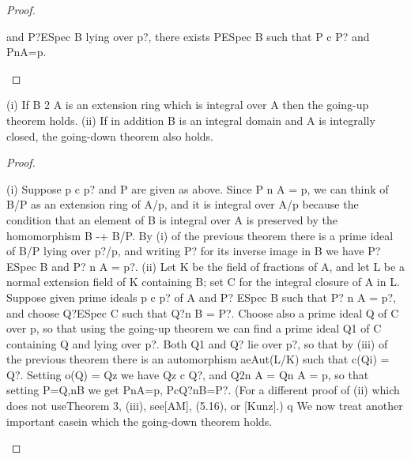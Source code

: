 \begin{proof}
\begin{mathematicalrecord}
and P?ESpec B lying over p?, there exists PESpec B such that P c P? and
PnA=p.
\end{mathematicalrecord}
\end{proof}


\begin{theorem}[Theorem 9.4]\label{mcrt-auto-theorem-9-4}\uses{}
\begin{mathematicalrecord}
(i) If B 2 A is an extension ring which is integral over A then
the going-up theorem holds.
   (ii) If in addition B is an integral domain and A is integrally closed, the
going-down      theorem also holds.
\end{mathematicalrecord}
\end{theorem}
\begin{proof}
\begin{mathematicalrecord}
(i) Suppose p c p? and P are given as above. Since P n A = p, we can
think of B/P as an extension ring of A/p, and it is integral over A/p because
the condition that an element of B is integral over A is preserved by the
homomorphism B -+ B/P. By (i) of the previous theorem there is a prime
ideal of B/P lying over p?/p, and writing P? for its inverse image in B we have
P?ESpec B and P? n A = p?.
   (ii) Let K be the field of fractions of A, and let L be a normal extension
field of K containing B; set C for the integral closure of A in L. Suppose
given prime ideals p c p? of A and P? ESpec B such that P? n A = p?, and
choose Q?ESpec C such that Q?n B = P?. Choose also a prime ideal Q of C
over p, so that using the going-up theorem we can find a prime ideal Q1 of C
containing Q and lying over p?. Both Q1 and Q? lie over p?, so that by (iii) of
the previous theorem there is an automorphism aeAut(L/K) such that
c(Qi) = Q?. Setting o(Q) = Qz we have Qz c Q?, and Q2n A = Qn A = p,
so that setting P=Q,nB             we get PnA=p,         PcQ?nB=P?.        (For
a different proof of (ii) which does not useTheorem 3, (iii), see[AM], (5.16),
or [Kunz].)        q
   We now treat another important casein which the going-down theorem
holds.
\end{mathematicalrecord}
\end{proof}



